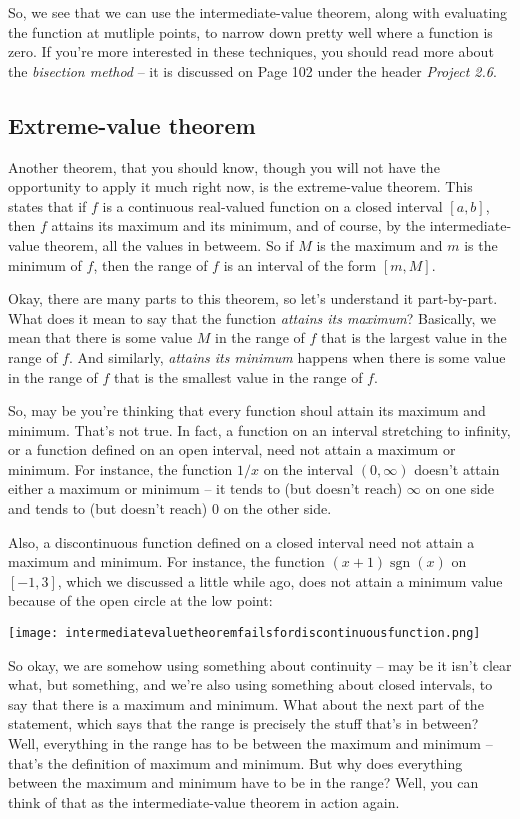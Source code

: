 \documentclass[10pt]{amsart}
\begin{document}
So, we see that we can use the intermediate-value theorem, along with
evaluating the function at mutliple points, to narrow down pretty well
where a function is zero. If you're more interested in these
techniques, you should read more about the {\em bisection method} --
it is discussed on Page 102 under the header {\em Project 2.6}.

\subsection{Extreme-value theorem}

Another theorem, that you should know, though you will not have the
opportunity to apply it much right now, is the extreme-value
theorem. This states that if $f$ is a continuous real-valued function
on a closed interval $[a,b]$, then $f$ attains its maximum and its
minimum, and of course, by the intermediate-value theorem, all the
values in betweem. So if $M$ is the maximum and $m$ is the minimum of
$f$, then the range of $f$ is an interval of the form $[m,M]$.

Okay, there are many parts to this theorem, so let's understand it
part-by-part. What does it mean to say that the function {\em attains
its maximum}? Basically, we mean that there is some value $M$ in the
range of $f$ that is the largest value in the range of $f$. And
similarly, {\em attains its minimum} happens when there is some value
in the range of $f$ that is the smallest value in the range of $f$.

So, may be you're thinking that every function shoul attain its
maximum and minimum. That's not true. In fact, a function on an
interval stretching to infinity, or a function defined on an open
interval, need not attain a maximum or minimum. For instance, the
function $1/x$ on the interval $(0,\infty)$ doesn't attain either a
maximum or minimum -- it tends to (but doesn't reach) $\infty$ on one
side and tends to (but doesn't reach) $0$ on the other side.

Also, a discontinuous function defined on a closed interval need not
attain a maximum and minimum. For instance, the function $(x +
1)\operatorname{sgn}(x)$ on $[-1,3]$, which we discussed a little
while ago, does not attain a minimum value because of the open circle
at the low point:

\texttt{[image: intermediatevaluetheoremfailsfordiscontinuousfunction.png]}

So okay, we are somehow using something about continuity -- may be it
isn't clear what, but something, and we're also using something about
closed intervals, to say that there is a maximum and minimum. What
about the next part of the statement, which says that the range is
precisely the stuff that's in between? Well, everything in the range
has to be between the maximum and minimum -- that's the definition of
maximum and minimum. But why does everything between the maximum and
minimum have to be in the range? Well, you can think of that as the
intermediate-value theorem in action again.
\end{document}
